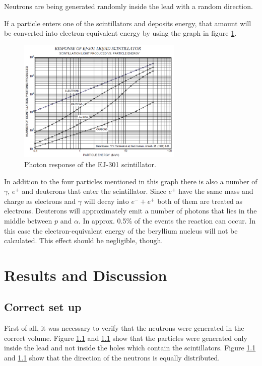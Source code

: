 \documentclass[12pt]{article}
\begin{document}
Neutrons are being generated randomly inside the lead with a random direction.

If a particle enters one of the scintillators and deposits energy, that amount will be converted into electron-equivalent energy by using the graph in figure \ref{fig:photonResponse}.

\begin{figure}[htbp]
	\centering
	\includegraphics[width=0.7\textwidth]{./pics/scintillatorResponse.pdf}
	\caption{Photon response of the EJ-301 scintillator.}
	\label{fig:photonResponse}
\end{figure}
In addition to the four particles mentioned in this graph there is also a number of $\gamma$, $e^+$ and deuterons that enter the scintillator. Since $e^+$ have the same mass and charge as electrons and $\gamma$ will decay into $e^- + e^+$ both of them are treated as electrons. Deuterons will approximately emit a number of photons that lies in the middle between $p$ and $\alpha$. In approx. 0.5\% of the events the reaction  can occur. In this case the electron-equivalent energy of the beryllium nucleus will not be calculated. This effect should be negligible, though.

\section{Results and Discussion}

\subsection{Correct set up}

First of all, it was necessary to verify that the neutrons were generated in the correct volume. Figure \ref{} and \ref{} show that the particles were generated only inside the lead and not inside the holes which contain the scintillators. Figure \ref{} and \ref{} show that the direction of the neutrons is equally distributed.
\end{document}
